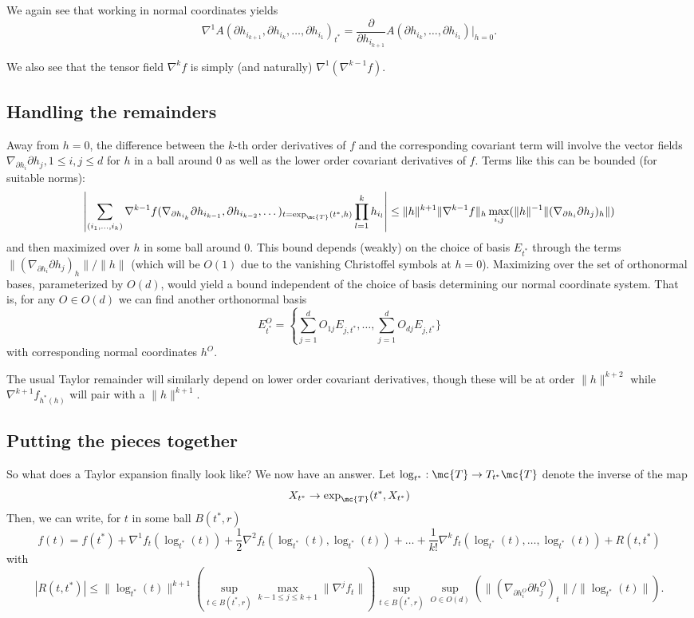 \documentclass{article}
\begin{document}
We again see that working in normal coordinates yields
$$
\nabla^1 A(\partial h_{i_{k+1}}, \partial h_{i_k}, \dots, \partial h_{i_1})_{t^*} =
\frac{\partial}{\partial h_{i_{k+1}}} A(\partial h_{i_k}, \dots, \partial h_{i_1}) \biggl|_{h=0}.
$$

We also see that the tensor field $\nabla^k f$ is simply (and naturally) $\nabla^1(\nabla^{k-1} f)$.

\subsection{Handling the remainders}

Away from $h=0$, the difference between the $k$-th order derivatives of $f$
and the corresponding covariant term will involve 
the vector fields $\nabla_{\partial h_i} \partial h_j, 1 \leq i,j \leq d$ for $h$ in a ball around 0 as well as the lower order covariant derivatives of $f$. Terms like this can be bounded (for suitable norms):
$$
\left|\sum_{(i_1,\dots,i_k)} \nabla^{k-1} f(\nabla_{\partial h_{i_k}}\partial h_{i_{k-1}}, \partial h_{i_{k-2}}, \dots)_{t=\exp_{\mc{T}}(t^*, h)} \prod_{l=1}^k h_{i_l}\right|
\leq \|h\|^{k+1} \|\nabla^{k-1}f\|_h \max_{i,j} (\|h\|^{-1}\|(\nabla_{\partial h_i}\partial h_j)_h\|)
$$
and then maximized over $h$ in some ball around 0. This bound depends (weakly) on the choice of basis $E_{t^*}$ through the terms $\|(\nabla_{\partial h_i}\partial h_j)_h\|/\|h\|$ (which will be $O(1)$ due to
the vanishing Christoffel symbols at $h=0$). Maximizing
over the set of orthonormal bases, parameterized by $O(d)$, would yield a bound independent of the choice of
basis determining our normal
coordinate system. That is, for any $O \in O(d)$ we can find another orthonormal basis
$$
E^O_{t^*} = \left\{\sum_{j=1}^d O_{1j}E_{j,t^*}, \dots, \sum_{j=1}^d O_{dj}E_{j,t^*} \}
$$
with corresponding normal coordinates $h^O$.

The usual Taylor remainder will similarly depend on lower order covariant derivatives, though these will be at order $\|h\|^{k+2}$ while $\nabla^{k+1} f_{h^*(h)}$ will pair with a $\|h\|^{k+1}$.

\subsection{Putting the pieces together}

So what does a Taylor expansion finally look like? We now have an answer. Let $\log_{t^*}:\mc{T} \rightarrow
T_{t^*}\mc{T}$ denote the inverse of the map
$$
X_{t^*} \to \exp_{\mc{T}}(t^*, X_{t^*})
$$
Then, we can write, for $t$ in some ball $B(t^*,r)$
$$
f(t) = f(t^*) + \nabla^1 f_t(\log_{t^*}(t)) + \frac{1}{2} \nabla^2 f_t(\log_{t^*}(t), \log_{t^*}(t))
+ \dots + \frac{1}{k!} \nabla^k f_t(\log_{t^*}(t), \dots, \log_{t^*}(t)) + R(t,t^*)
$$
with
$$
|R(t,t^*)| \leq \|\log_{t^*}(t)\|^{k+1} \left(\sup_{t \in B(t^*,r)} \max_{k-1 \leq j \leq k+1} \|\nabla^j f_t\|\right)
\sup_{t \in B(t^*,r)} \sup_{O \in O(d)} (\|(\nabla_{\partial h_i^O}\partial h_j^O)_t\| / \|\log_{t^*}(t)\|).
$$
\end{document}
